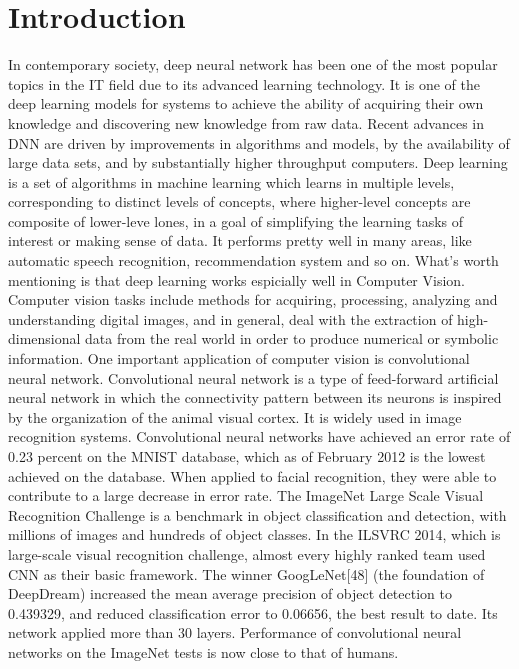 \documentclass{sig-alternate}
\begin{document}
\section{Introduction}
    In contemporary society, deep neural network has been one of the most popular topics in the IT field due to its advanced learning technology. It is one of the deep learning models for systems to achieve the ability of acquiring their own knowledge and discovering new knowledge from raw data. Recent advances in DNN are driven by improvements in algorithms and models, by the availability of large data sets, and by substantially higher throughput computers. Deep learning is a set of algorithms in machine learning which learns in multiple levels, corresponding to distinct levels of concepts, where higher-level concepts are composite of lower-leve lones, in a goal of simplifying the learning tasks of interest or making sense of data. It performs pretty well in many areas, like automatic speech recognition, recommendation system and so on. What’s worth mentioning is that deep learning works espicially well in Computer Vision. Computer vision tasks include methods for acquiring, processing, analyzing and understanding digital images, and in general, deal with the extraction of high-dimensional data from the real world in order to produce numerical or symbolic information. One important application of computer vision is convolutional neural network. Convolutional neural network is a type of feed-forward artificial neural network in which the connectivity pattern between its neurons is inspired by the organization of the animal visual cortex. It is widely used in image recognition systems. Convolutional neural networks have achieved an error rate of 0.23 percent on the MNIST database, which as of February 2012 is the lowest achieved on the database. When applied to facial recognition, they were able to contribute to a large decrease in error rate. The ImageNet Large Scale Visual Recognition Challenge is a benchmark in object classification and detection, with millions of images and hundreds of object classes. In the ILSVRC 2014, which is large-scale visual recognition challenge, almost every highly ranked team used CNN as their basic framework. The winner GoogLeNet[48] (the foundation of DeepDream) increased the mean average precision of object detection to 0.439329, and reduced classification error to 0.06656, the best result to date. Its network applied more than 30 layers. Performance of convolutional neural networks on the ImageNet tests is now close to that of humans.\\
\end{document}
